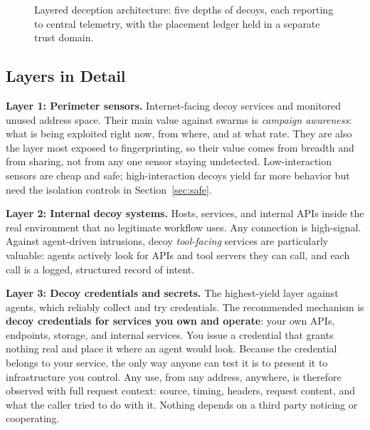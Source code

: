\documentclass[11pt,letterpaper]{article}
\begin{document}
\begin{figure}[htbp]
\caption{Layered deception architecture: five depths of decoys, each reporting to central telemetry, with the placement ledger held in a separate trust domain.}
\label{fig:layers}
\end{figure}

\subsection{Layers in Detail}
\label{sec:layerdetail}

\textbf{\textcolor{deepindigo}{Layer 1: Perimeter sensors.}} Internet-facing decoy services and monitored unused address space. Their main value against swarms is \emph{campaign awareness}: what is being exploited right now, from where, and at what rate. They are also the layer most exposed to fingerprinting, so their value comes from breadth and from sharing, not from any one sensor staying undetected. Low-interaction sensors are cheap and safe; high-interaction decoys yield far more behavior but need the isolation controls in Section~\ref{sec:safe}.

\textbf{\textcolor{deepindigo}{Layer 2: Internal decoy systems.}} Hosts, services, and internal APIs inside the real environment that no legitimate workflow uses. Any connection is high-signal. Against agent-driven intrusions, decoy \emph{tool-facing} services are particularly valuable: agents actively look for APIs and tool servers they can call, and each call is a logged, structured record of intent.

\textbf{\textcolor{deepindigo}{Layer 3: Decoy credentials and secrets.}} The highest-yield layer against agents, which reliably collect and try credentials. The recommended mechanism is \textbf{decoy credentials for services you own and operate}: your own APIs, endpoints, storage, and internal services. You issue a credential that grants nothing real and place it where an agent would look. Because the credential belongs to your service, the only way anyone can test it is to present it to infrastructure you control. Any use, from any address, anywhere, is therefore observed with full request context: source, timing, headers, request content, and what the caller tried to do with it. Nothing depends on a third party noticing or cooperating.
\end{document}
